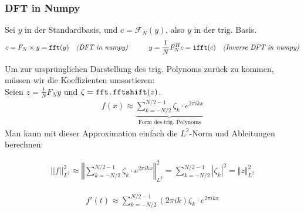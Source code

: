 \subsubsection{DFT in Numpy}

Sei $y$ in der Standardbasis, und $c = \mathcal{F}_N(y)$, also $y$ in der trig. Basis.
$$
    c = F_N \times y = \verb|fft|(y)\quad \textit{(DFT in numpy)} \quad \quad \quad y = \frac{1}{N}F_N^Hc = \verb|ifft|(c)\quad \textit{(Inverse DFT in numpy)}
$$

Um zur ursprünglichen Darstellung des trig. Polynoms zurück zu kommen, müssen wir die Koeffizienten umsortieren: \\
Seien $z = \frac{1}{N} F_N y$ und  $\zeta = \verb|fft.fftshift|(z)$. 
\begin{align*}
    f(x) \approx \underbrace{\sum_{k=-N/2}^{N/2-1} \zeta_k \cdot e^{2 \pi ikx} }_{\text{Form des trig. Polynoms}}
\end{align*}
\setcounter{all}{13}
\inlineremark Man kann mit dieser Approximation einfach die $L^2$-Norm und Ableitungen berechnen:
\begin{multicols}{2}
\begin{align*}
    ||f||^2_{L^2} \approx \left\Vert \sum_{k=-N/2}^{N/2-1} \zeta_k \cdot e^{2 \pi ikx} \right\Vert^2_{L^2} = \sum_{k=-N/2}^{N/2-1} |\zeta_k|^2 = \Vert z \Vert^2_{L^2}
\end{align*}

\newcolumn

\begin{align*}
    f'(t) \approx \sum_{k=-N/2}^{N/2-1} (2\pi ik) \zeta_k \cdot e^{2 \pi ikx} 
\end{align*}
\end{multicols}